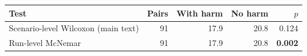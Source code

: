 \begin{tabular}{l r rr r}
\toprule
Test & Pairs & With harm & No harm & $p$ \\
\midrule
Scenario-level Wilcoxon (main text) & 91 & 17.9 & 20.8 & 0.124 \\
Run-level McNemar & 91 & 17.9 & 20.8 & \textbf{0.002} \\
\bottomrule
\end{tabular}